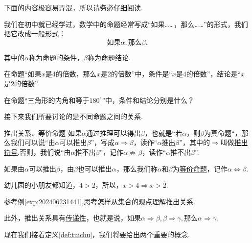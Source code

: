 \documentclass[lang=cn,math=cm,chinesefont=nofont,11pt,scheme=chinese,twocol]{elegantbook}
\begin{document}
\begin{remark}
  下面的内容极容易弄混，所以请务必仔细阅读.
\end{remark}

我们在初中就已经学过，数学中的命题经常写成“如果……，那么……”的形式，我们把它改成一般形式：
$$\text{如果}\alpha ,\text{那么}\beta.$$

其中的$\alpha$称为命题的\underline{条件}，$\beta$称为命题\underline{结论}.

\begin{example}
  在命题“如果$x$是4的倍数，那么$x$是2的倍数”中，条件是“$x$是4的倍数”，结论是“$x$是2的倍数”.
\end{example}

\begin{exercise}
  在命题“三角形的内角和等于$180^{\circ}$”中，条件和结论分别是什么？
\end{exercise}

\hspace*{\fill}

接下来我们所要讨论的是不同命题之间的关系.

\begin{definition}{推出关系、等价命题}\label{def:tuichu}
  如果$\alpha$通过推理可以得出$\beta$，也就是“若$\alpha$，则$\beta$为真命题“，那么我们可以说“由$\alpha$可以推出$\beta$”，写成$\alpha\Rightarrow\beta$，读作“$\alpha$推出$\beta$”，其中的$\Rightarrow$叫做\underline{推出符号}.否则，我们说“由$\alpha$推不出$\beta$”，记作$\alpha\nRightarrow\beta$，读作“$\alpha$推不出$\beta$”.

  如果由$\alpha$可以推出$\beta$，由$\beta$也可以推出$\alpha$，那么我们称$\alpha$和$\beta$为\underline{等价命题}，记作$\alpha\Leftrightarrow\beta$.
\end{definition}

\begin{example}\label{exp:202406231441}
  幼儿园的小朋友都知道，$4>2$，所以，$x>4\Rightarrow x>2$.
\end{example}

\begin{problem}\label{202406262000}
  参考例\ref{exp:202406231441},思考怎样从集合的观点理解推出关系.
\end{problem}

此外，推出关系具有\underline{传递性}，也就是说，如果$\alpha\Rightarrow\beta,\beta\Rightarrow\gamma,$那么$\alpha\Rightarrow\gamma$.

\hspace*{\fill}

现在我们接着定义\ref{def:tuichu}，我们将要给出两个重要的概念.
\end{document}
